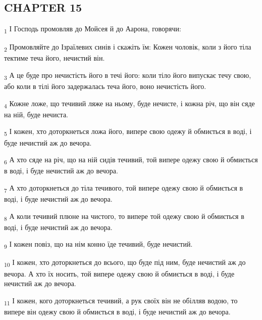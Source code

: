 \subsection{CHAPTER 15}
\begin{tcolorbox}
\textsubscript{1} І Господь промовляв до Мойсея й до Аарона, говорячи:
\end{tcolorbox}
\begin{tcolorbox}
\textsubscript{2} Промовляйте до Ізраїлевих синів і скажіть їм: Кожен чоловік, коли з його тіла тектиме теча його, нечистий він.
\end{tcolorbox}
\begin{tcolorbox}
\textsubscript{3} А це буде про нечистість його в течі його: коли тіло його випускає течу свою, або коли в тілі його задержалась теча його, воно нечистість його.
\end{tcolorbox}
\begin{tcolorbox}
\textsubscript{4} Кожне ложе, що течивий ляже на ньому, буде нечисте, і кожна річ, що він сяде на ній, буде нечиста.
\end{tcolorbox}
\begin{tcolorbox}
\textsubscript{5} І кожен, хто доторкнеться ложа його, випере свою одежу й обмиється в воді, і буде нечистий аж до вечора.
\end{tcolorbox}
\begin{tcolorbox}
\textsubscript{6} А хто сяде на річ, що на ній сидів течивий, той випере одежу свою й обмиється в воді, і буде нечистий аж до вечора.
\end{tcolorbox}
\begin{tcolorbox}
\textsubscript{7} А хто доторкнеться до тіла течивого, той випере одежу свою й обмиється в воді, і буде нечистий аж до вечора.
\end{tcolorbox}
\begin{tcolorbox}
\textsubscript{8} А коли течивий плюне на чистого, то випере той одежу свою й обмиється в воді, і буде нечистий аж до вечора.
\end{tcolorbox}
\begin{tcolorbox}
\textsubscript{9} І кожен повіз, що на нім конно їде течивий, буде нечистий.
\end{tcolorbox}
\begin{tcolorbox}
\textsubscript{10} І кожен, хто доторкнеться до всього, що буде під ним, буде нечистий аж до вечора. А хто їх носить, той випере одежу свою й обмиється в воді, і буде нечистий аж до вечора.
\end{tcolorbox}
\begin{tcolorbox}
\textsubscript{11} І кожен, кого доторкнеться течивий, а рук своїх він не обілляв водою, то випере він одежу свою й обмиється в воді, і буде нечистий аж до вечора.
\end{tcolorbox}
